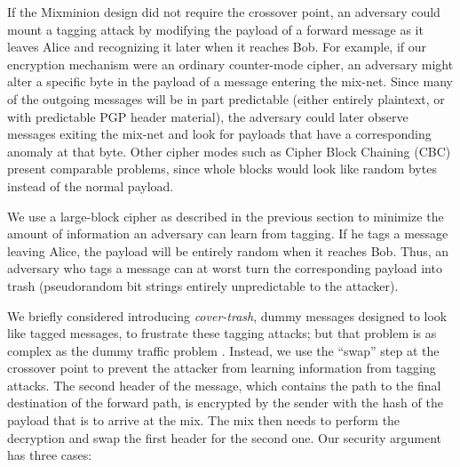 \documentclass[final]{ieee}
\begin{document}
If the Mixminion design did not require
the crossover point, an adversary could mount a tagging
attack by modifying the payload of a forward message as
it leaves Alice and recognizing it later when it reaches Bob.
For example, if our encryption mechanism were an ordinary
counter-mode cipher, an adversary might alter a specific byte in the payload of
a message entering the mix-net. Since many of the outgoing messages
will be in part predictable (either entirely plaintext, or with
predictable PGP header material), the adversary could later observe
messages exiting the mix-net and look for payloads that have a
corresponding anomaly at that byte. Other cipher modes such as
Cipher Block Chaining (CBC) present comparable problems, since whole
blocks would look like random bytes instead of the normal payload.

We use a large-block cipher as described in the previous section to
minimize the amount of information an adversary can learn from tagging.
If he tags a message
leaving Alice, the payload will be entirely random when it reaches
Bob.  Thus, an adversary who tags a message can at worst turn the
corresponding payload into trash (pseudorandom bit strings entirely
unpredictable to the attacker).


We briefly considered introducing \emph{cover-trash}, dummy messages
designed to look like tagged messages, to frustrate
these tagging attacks; but that problem is as complex as the dummy
traffic problem \cite{langos02}. Instead, we use the
``swap'' step at the
crossover point to prevent the attacker from learning information from
tagging attacks. The second header of the message, which contains the
path to the final destination of the forward path, is encrypted by the
sender with the hash of the payload that is to arrive at the mix. The
mix then needs to perform the decryption and swap the first header for
the second one.
Our security argument has three cases:
\end{document}
